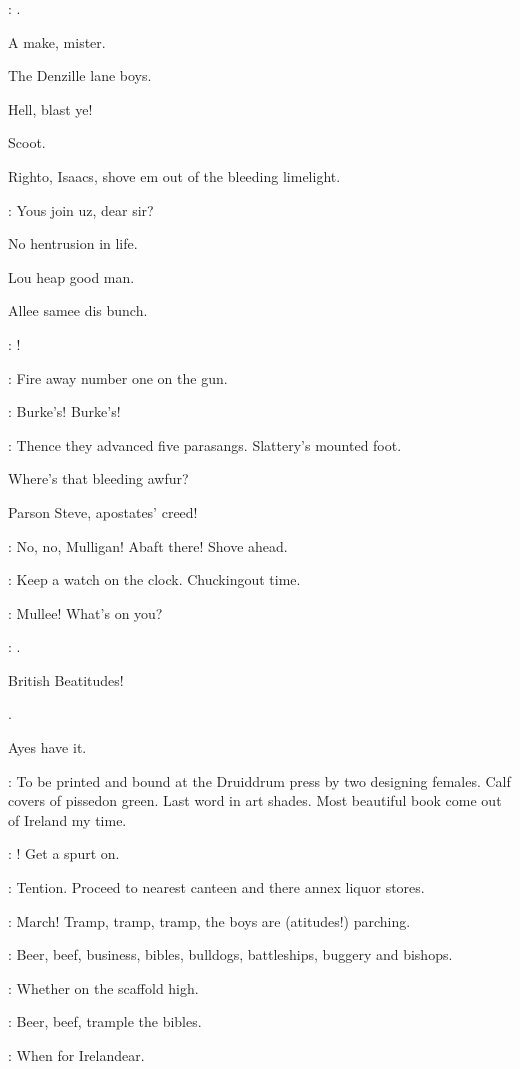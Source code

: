 \mulligan:
.

A make,
mister.

The Denzille lane boys.

Hell,
blast ye!

Scoot.

Righto,
Isaacs,
shove em out of the bleeding limelight.

\punch:
Yous join uz,
dear sir?

No hentrusion in life.

Lou heap good man.

Allee samee dis bunch.

\bannon:
!

\lenehan:
Fire away number one on the gun.

\All:
Burke's!
Burke's!

:
Thence they advanced five parasangs.
Slattery's mounted foot.

Where's that bleeding awfur?

Parson Steve,
apostates' creed!

\lynch:
No,
no,
Mulligan!
Abaft there!
Shove ahead.

\lenehan:
Keep a watch on the clock.
Chuckingout time.

\madden:
Mullee!
What's on you?

\mulligan:
.

British Beatitudes!

.

Ayes have it.

\stephen:
To be printed and bound at the Druiddrum press by two designing females.
Calf covers of pissedon green.
Last word in art shades.
Most beautiful book come out of Ireland my time.

\crotthers:
!
Get a spurt on.

\lenehan:
Tention.
Proceed to nearest canteen and there annex liquor stores.

\punch:
March!
Tramp,
tramp,
tramp,
the boys are
(atitudes!)
parching.

\madden:
Beer,
beef,
business,
bibles,
bulldogs,
battleships,
buggery and bishops.%

\dixon:
Whether on the scaffold high.

\madden:
Beer,
beef,
trample the bibles.

\dixon:
When for Irelandear.

